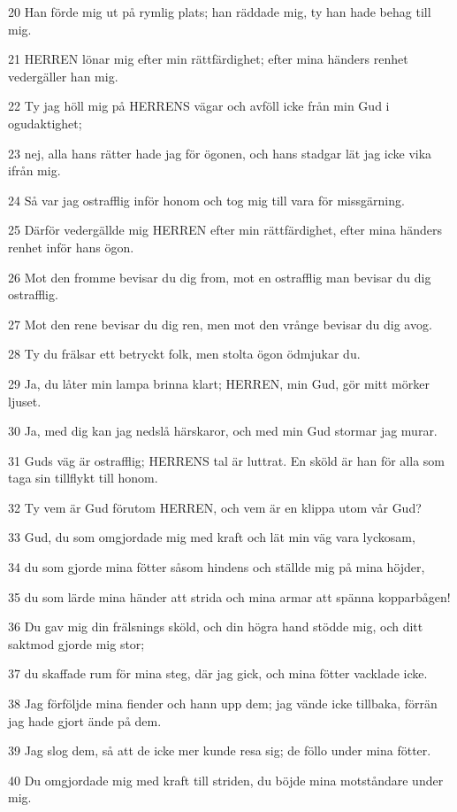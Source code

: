 \par 20 Han förde mig ut på rymlig plats; han räddade mig, ty han hade behag till mig.
\par 21 HERREN lönar mig efter min rättfärdighet; efter mina händers renhet vedergäller han mig.
\par 22 Ty jag höll mig på HERRENS vägar och avföll icke från min Gud i ogudaktighet;
\par 23 nej, alla hans rätter hade jag för ögonen, och hans stadgar lät jag icke vika ifrån mig.
\par 24 Så var jag ostrafflig inför honom och tog mig till vara för missgärning.
\par 25 Därför vedergällde mig HERREN efter min rättfärdighet, efter mina händers renhet inför hans ögon.
\par 26 Mot den fromme bevisar du dig from, mot en ostrafflig man bevisar du dig ostrafflig.
\par 27 Mot den rene bevisar du dig ren, men mot den vrånge bevisar du dig avog.
\par 28 Ty du frälsar ett betryckt folk, men stolta ögon ödmjukar du.
\par 29 Ja, du låter min lampa brinna klart; HERREN, min Gud, gör mitt mörker ljuset.
\par 30 Ja, med dig kan jag nedslå härskaror, och med min Gud stormar jag murar.
\par 31 Guds väg är ostrafflig; HERRENS tal är luttrat. En sköld är han för alla som taga sin tillflykt till honom.
\par 32 Ty vem är Gud förutom HERREN, och vem är en klippa utom vår Gud?
\par 33 Gud, du som omgjordade mig med kraft och lät min väg vara lyckosam,
\par 34 du som gjorde mina fötter såsom hindens och ställde mig på mina höjder,
\par 35 du som lärde mina händer att strida och mina armar att spänna kopparbågen!
\par 36 Du gav mig din frälsnings sköld, och din högra hand stödde mig, och ditt saktmod gjorde mig stor;
\par 37 du skaffade rum för mina steg, där jag gick, och mina fötter vacklade icke.
\par 38 Jag förföljde mina fiender och hann upp dem; jag vände icke tillbaka, förrän jag hade gjort ände på dem.
\par 39 Jag slog dem, så att de icke mer kunde resa sig; de föllo under mina fötter.
\par 40 Du omgjordade mig med kraft till striden, du böjde mina motståndare under mig.
